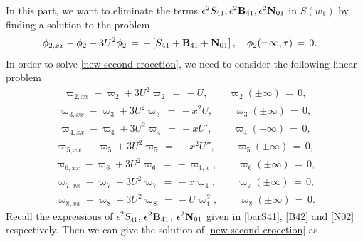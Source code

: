 \documentclass[10pt, reqno]{amsart}
\numberwithin{equation}{section}
\theoremstyle{definition}
\begin{document}
{{In this part, we want to eliminate the terms
$\epsilon^2 S_{41},  \epsilon^2 {\bf B}_{41}, \epsilon^2 {\bf N}_{01} $
in $S(w_1)$ by finding a solution to the problem
\begin{align}
\label{new second croection}
 & \phi_{2, xx} - \phi_{2} + 3 U^2 \phi_{2}
 \,=\, - \left[ S_{41} + {\bf B}_{41} + {\bf N}_{01}\right],
\quad \phi_{2}(\pm \infty, \tau) \,=\, 0.
\end{align}
In order to solve \eqref{new second croection}, we need to consider the following linear problem
\begin{align*}
\varpi_{2, xx} - \varpi_2 + 3 U^2 \varpi_2 \,=\, -U, \qquad \varpi_2(\pm \infty) \,=\, 0,
\end{align*}
\begin{align*}
\varpi_{3, xx} - \varpi_{3} + 3 U^2 \varpi_{3} \,=\,  - x^2U,
\qquad \varpi_3(\pm \infty) \,=\, 0,
\end{align*}
\begin{align*}
\varpi_{4, xx} - \varpi_{4} + 3 U^2 \varpi_{4} \,=\,- xU',
\qquad \varpi_4(\pm \infty) \,=\, 0,
\end{align*}
\begin{align*}
\varpi_{5, xx} - \varpi_{5} + 3 U^2\varpi_{5}
\,=\, -x^2U'',
\qquad \varpi_5(\pm \infty) \,=\, 0,
\end{align*}
\begin{align*}
\varpi_{6, xx} - \varpi_{6} + 3 U^2\varpi_{6}
\,=\,-\varpi_{1,x} ,
\qquad \varpi_6(\pm \infty) \,=\, 0,
\end{align*}
\begin{align*}
\varpi_{7, xx} - \varpi_{7} + 3 U^2\varpi_{7}
\,=\, -x\varpi_1,
\qquad \varpi_7(\pm \infty) \,=\, 0,
\end{align*}
\begin{align*}
\varpi_{8, xx} - \varpi_{8} + 3 U^2\varpi_{8}
\,=\, -U\varpi_1^2,
\qquad \varpi_{8}(\pm \infty) \,=\, 0.
\end{align*}
Recall the expressions of $\epsilon^2 S_{41}$, $ \epsilon^2 {\bf B}_{41}$, $\epsilon^2 {\bf N}_{01} $ given in \eqref{barS41},  \eqref{B42}  and \eqref{N02} respectively.
Then we can give the solution of \eqref{new second croection} as
}}
\end{document}
